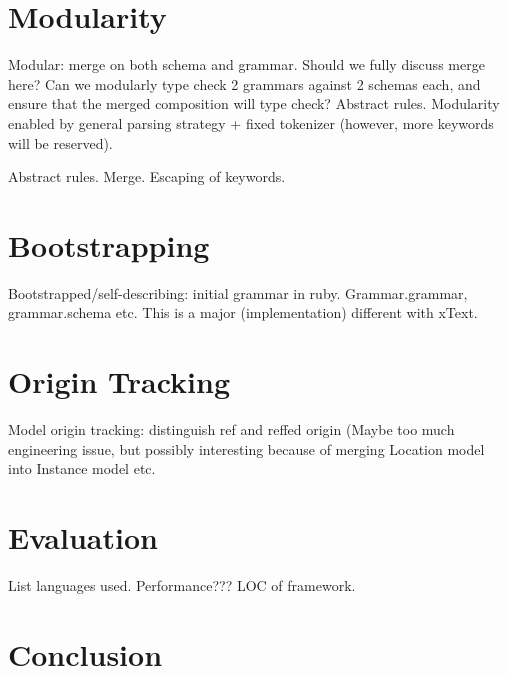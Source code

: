 \documentclass[preprint,10pt]{sigplanconf}
\begin{document}
\section{Modularity}

Modular: merge on both schema and grammar. Should we fully discuss
merge here? Can we modularly type check 2 grammars against 2 schemas
each, and ensure that the merged composition will type check? Abstract
rules. Modularity enabled by general parsing strategy + fixed
tokenizer (however, more keywords will be reserved).

Abstract rules. Merge. Escaping of keywords.


\section{Bootstrapping}

Bootstrapped/self-describing: initial grammar in
ruby. Grammar.grammar, grammar.schema etc. This is a major
(implementation) different with xText.

\section{Origin Tracking}

Model origin tracking: distinguish ref and reffed origin (Maybe too
much engineering issue, but possibly interesting because of merging
Location model into Instance model etc.

\section{Evaluation}

List languages used. Performance??? LOC of framework.


\section{Conclusion}
\end{document}
